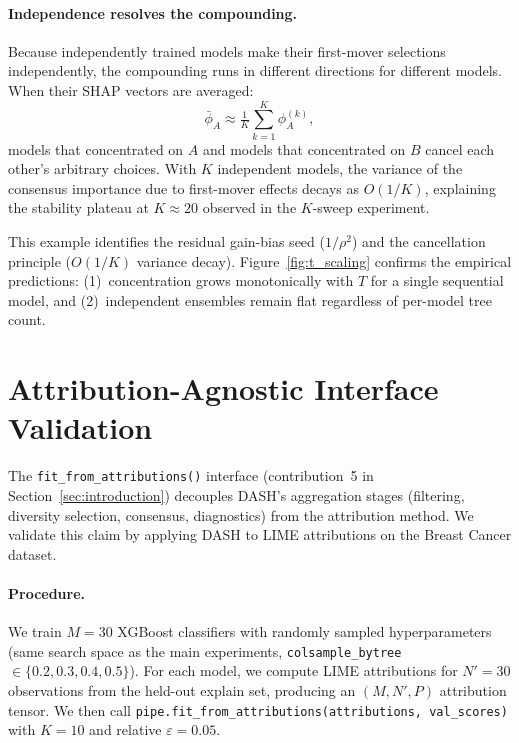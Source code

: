 \documentclass[11pt]{article}
\newcommand{\dash}{\textsc{DASH}}
\begin{document}
\paragraph{Independence resolves the compounding.}
Because independently trained models make their first-mover selections
independently, the compounding runs in different directions for different
models.  When their SHAP vectors are averaged:
\begin{equation}
  \bar{\phi}_A \approx \tfrac{1}{K}\sum_{k=1}^{K} \phi_A^{(k)},
\end{equation}
models that concentrated on $A$ and models that concentrated on $B$
cancel each other's arbitrary choices. With $K$ independent models, the
variance of the consensus importance due to first-mover effects decays
as $O(1/K)$, explaining the stability plateau at $K \approx 20$
observed in the $K$-sweep experiment.

This example identifies the residual gain-bias seed ($1/\rho^2$)
and the cancellation principle ($O(1/K)$ variance decay).
Figure~\ref{fig:t_scaling} confirms the empirical predictions:
(1)~concentration grows monotonically with $T$ for a single sequential
model, and (2)~independent ensembles remain flat regardless of
per-model tree count.


\section{Attribution-Agnostic Interface Validation}
\label{app:lime_demo}

The \texttt{fit\_from\_attributions()} interface (contribution~5 in
Section~\ref{sec:introduction}) decouples \dash{}'s aggregation stages
(filtering, diversity selection, consensus, diagnostics) from the
attribution method. We validate this claim by applying \dash{} to LIME
\citep{ribeiro2016lime} attributions on the Breast Cancer dataset.

\paragraph{Procedure.}
We train $M = 30$ XGBoost classifiers with randomly sampled
hyperparameters (same search space as the main experiments,
\texttt{colsample\_bytree} $\in \{0.2, 0.3, 0.4, 0.5\}$).
For each model, we compute LIME attributions for $N' = 30$ observations
from the held-out explain set, producing an $(M, N', P)$ attribution
tensor. We then call
\texttt{pipe.fit\_from\_attributions(attributions, val\_scores)} with
$K = 10$ and relative $\varepsilon = 0.05$.
\end{document}
